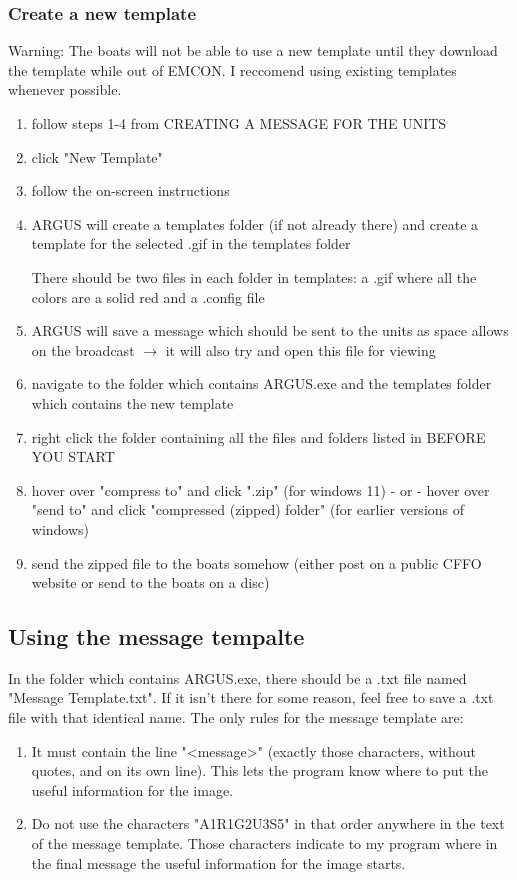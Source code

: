 \subsubsection{Create a new template}
\begin{addwarn}
    Warning: The boats will not be able to use a new template until they download the template while out of EMCON. I reccomend using existing templates whenever possible.
\end{addwarn}
\begin{enumerate}
    \item follow steps 1-4 from CREATING A MESSAGE FOR THE UNITS
    \item click "New Template"
    \item follow the on-screen instructions
    \item ARGUS will create a templates folder (if not already there) and create a template for the selected .gif in the templates folder
    \begin{addnote} There should be two files in each folder in templates: a .gif where all the colors are a solid red and a .config file \end{addnote}
    \item ARGUS will save a message which should be sent to the units as space allows on the broadcast $\rightarrow$ it will also try and open this file for viewing
    \item navigate to the folder which contains ARGUS.exe and the templates folder which contains the new template
    \item right click the folder containing all the files and folders listed in BEFORE YOU START
    \item hover over "compress to" and click ".zip" (for windows 11) - or - hover over "send to" and click "compressed (zipped) folder" (for earlier versions of windows)
    \item send the zipped file to the boats somehow (either post on a public CFFO website or send to the boats on a disc)
\end{enumerate}

\subsection{Using the message tempalte}
In the folder which contains ARGUS.exe, there should be a .txt file named "Message Template.txt".  If it isn't there for some reason, feel free to save a .txt file with that identical name. The only rules for the message template are:
\begin{enumerate}
    \item It must contain the line "<message>" (exactly those characters, without quotes, and on its own line).  This lets the program know where to put the useful information for the image.
    \item Do not use the characters "A1R1G2U3S5" in that order anywhere in the text of the message template.  Those characters indicate to my program where in the final message the useful information for the image starts.
\end{enumerate}

